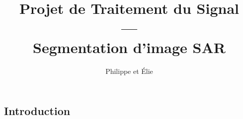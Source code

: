 \documentclass{beamer}
\title{Projet de Traitement du Signal\\---\\Segmentation d'image SAR}
\author{Philippe \bsc{Tran Ba} et Élie \bsc{Bouttier}}
\institute{ENSEEIHT, département TR}
\begin{document}
\begin{frame}
\titlepage
\tableofcontents
\end{frame}

\begin{frame}
\section{Introduction}
\end{frame}
\end{document}
